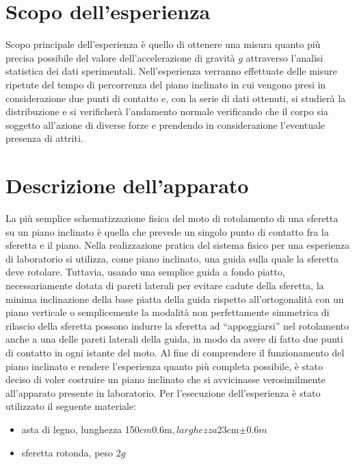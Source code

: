 \documentclass[a4paper, 12pt]{article} %
\begin{document}
\section{Scopo dell'esperienza}
Scopo principale dell'esperienza è quello di ottenere una misura quanto più precisa possibile del valore dell'accelerazione di gravità $g$ attraverso l'analisi statistica dei dati sperimentali. Nell'esperienza verranno effettuate delle misure ripetute del tempo di percorrenza del piano inclinato in cui vengono presi in considerazione due punti di contatto e, con la serie di dati ottenuti, si studierà la distribuzione e si verificherà l'andamento normale verificando che il corpo sia soggetto all'azione di diverse forze e prendendo in considerazione l'eventuale presenza di attriti.

 


\section{Descrizione dell'apparato}
La più semplice schematizzazione fisica del moto di rotolamento di una sferetta su un piano inclinato è quella che prevede un singolo punto di contatto fra la sferetta e il piano. Nella realizzazione pratica del sistema fisico per una esperienza di laboratorio si utilizza, come piano inclinato, una guida sulla quale la sferetta deve rotolare. Tuttavia, usando una
semplice guida a fondo piatto, necessariamente dotata di pareti laterali per evitare cadute della sferetta, la minima inclinazione della base piatta della guida rispetto all'ortogonalità con un piano verticale o semplicemente la modalità non perfettamente simmetrica di rilascio della sferetta possono indurre la sferetta ad “appoggiarsi” nel rotolamento anche a una delle pareti laterali della guida, in modo da avere di fatto due punti di contatto in ogni istante del moto.\vfill
Al fine di comprendere il funzionamento del piano inclinato e rendere l'esperienza quanto più completa possibile, è stato deciso di voler costruire un piano inclinato che si avvicinasse verosimilmente all'apparato presente in laboratorio.\vfill
Per l'esecuzione dell'esperienza è stato utilizzato il seguente materiale: \begin{itemize}
	\item asta di legno, lunghezza 150$cm$\pm0.6m$, larghezza 23$cm$\pm0.6m$
\end{itemize}
\begin{itemize}
	\item sferetta rotonda, peso 2$g$ 
\end{itemize}
\end{document}
